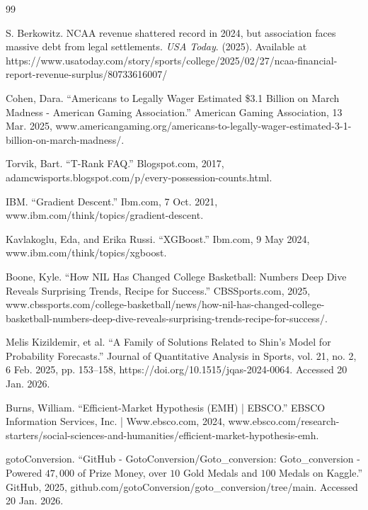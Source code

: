 \documentclass[12pt,leqno]{article}\usepackage[pdftex]{graphicx}\usepackage[usenames,dvipsnames]{xcolor}
\theoremstyle{remark}
\begin{document}
\begin{thebibliography}{99}
\singlespacing %
\thispagestyle{empty} %

 S. Berkowitz. NCAA revenue shattered record in 2024, but association faces massive debt from legal settlements. \emph{USA Today}. (2025). Available at https://www.usatoday.com/story/sports/college/2025/02/27/ncaa-financial-report-revenue-surplus/80733616007/

 Cohen, Dara. “Americans to Legally Wager Estimated \$3.1 Billion on March Madness - American Gaming Association.” American Gaming Association, 13 Mar. 2025, www.americangaming.org/americans-to-legally-wager-estimated-3-1-billion-on-march-madness/.

 Torvik, Bart. “T-Rank FAQ.” Blogspot.com, 2017, adamcwisports.blogspot.com/p/every-possession-counts.html.

 IBM. “Gradient Descent.” Ibm.com, 7 Oct. 2021, www.ibm.com/think/topics/gradient-descent.

 Kavlakoglu, Eda, and Erika Russi. “XGBoost.” Ibm.com, 9 May 2024, www.ibm.com/think/topics/xgboost.

 Boone, Kyle. “How NIL Has Changed College Basketball: Numbers Deep Dive Reveals Surprising Trends, Recipe for Success.” CBSSports.com, 2025, www.cbssports.com/college-basketball/news/how-nil-has-changed-college-basketball-numbers-deep-dive-reveals-surprising-trends-recipe-for-success/.

 Melis Kizildemir, et al. “A Family of Solutions Related to Shin’s Model for Probability Forecasts.” Journal of Quantitative Analysis in Sports, vol. 21, no. 2, 6 Feb. 2025, pp. 153–158, https://doi.org/10.1515/jqas-2024-0064. Accessed 20 Jan. 2026.

 Burns, William. “Efficient-Market Hypothesis (EMH) | EBSCO.” EBSCO Information Services, Inc. | Www.ebsco.com, 2024, www.ebsco.com/research-starters/social-sciences-and-humanities/efficient-market-hypothesis-emh.

 gotoConversion. “GitHub - GotoConversion/Goto\_conversion: Goto\_conversion - Powered $47,000$ of Prize Money, over $10$ Gold Medals and $100$ Medals on Kaggle.” GitHub, 2025, github.com/gotoConversion/goto\_conversion/tree/main. Accessed 20 Jan. 2026.


\end{thebibliography}
\end{document}
